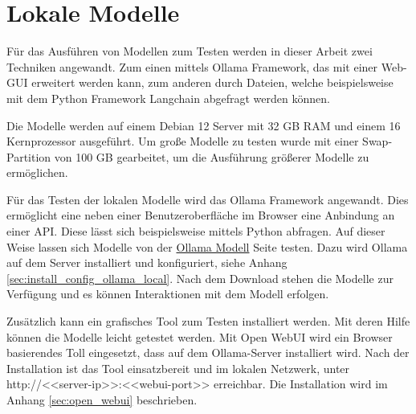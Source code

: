 \section{Lokale Modelle}
Für das Ausführen von Modellen zum Testen werden in dieser Arbeit zwei Techniken angewandt. Zum einen mittels Ollama Framework, das mit einer Web-GUI erweitert werden kann, zum anderen durch Dateien, welche beispielsweise mit dem Python Framework Langchain abgefragt werden können.\vspace{0.2cm}

Die Modelle werden auf einem Debian 12 Server mit 32 GB RAM und einem 16 Kernprozessor ausgeführt. Um große Modelle zu testen wurde mit einer Swap-Partition von 100 GB gearbeitet, um die Ausführung größerer Modelle zu ermöglichen.\vspace{0.2cm}

Für das Testen der lokalen Modelle wird das Ollama Framework angewandt. Dies ermöglicht eine neben einer Benutzeroberfläche im Browser eine Anbindung an einer API. Diese lässt sich beispielsweise mittels Python abfragen. Auf dieser Weise lassen sich Modelle von der \href{https://ollama.com/search}{Ollama Modell} Seite testen. Dazu wird Ollama auf dem Server installiert und konfiguriert, siehe Anhang \ref{sec:install_config_ollama_local}. Nach dem Download stehen die Modelle zur Verfügung und es können Interaktionen mit dem Modell erfolgen.\vspace{0.2cm}

Zusätzlich kann ein grafisches Tool zum Testen installiert werden. Mit deren Hilfe können die Modelle leicht getestet werden. Mit Open WebUI wird ein Browser basierendes Toll eingesetzt, dass auf dem Ollama-Server installiert wird. Nach der Installation ist das Tool einsatzbereit und im lokalen Netzwerk, unter http://<<server-ip>>:<<webui-port>> erreichbar. Die Installation wird im Anhang \ref{sec:open_webui} beschrieben.



